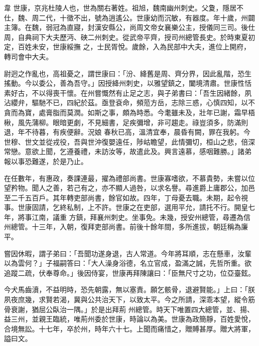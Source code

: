 
\begin{pinyinscope}

 韋
 世康，京兆杜陵人也，世為關右著姓。祖旭，魏南幽州刺史。父夐，隱居不仕，魏、周二代，十徵不出，號為逍遙公。世康幼而沉敏，有器度。年十歲，州闢主簿。在魏，弱冠為直寢，封漢安縣公，尚周文帝女襄樂公主，授儀同三司。後仕周，自典祠下大夫歷沔、硤二州刺史。從武帝平齊，授司州總管長史。於時東夏初定，百姓未安，世康綏撫
 之，士民胥悅。歲餘，入為民部中大夫，進位上開府，轉司會中大夫。



 尉迥之作亂也，高祖憂之，謂世康曰：「汾、絳舊是周、齊分界，因此亂階，恐生搖動。今以委公，善為吾守。」因授絳州刺史，以雅望鎮之，闔境清肅。世康性恬素好古，不以得喪干懷。在州嘗慨然有止足之志，與子弟書曰：「吾生因緒餘，夙沾纓弁，驅馳不已，四紀於茲。亟登袞命，頻蒞方岳，志除三惑，心慎四知，以不貪而為寶，處膏脂而莫潤。如斯之事，頗為時悉。今耄雖未及，壯年已謝，霜早梧楸，風先蒲柳。眼暗更劇，不見細書，足疾彌增，非可趨走。祿豈須多，防滿則退，年不待暮，有疾便辭。況娘
 春秋已高，溫清宜奉，晨昏有闕，罪在我躬。今世穆、世文並從戎役，吾與世沖復嬰遠任，陟岵瞻望，此情彌切，桓山之悲，倍深常戀。意欲上聞，乞遵養禮，未訪汝等，故遣此及。興言遠慕，感咽難勝。」諸弟報以事恐難遂，於是乃止。



 在任數年，有惠政，奏課連最，擢為禮部尚書。世康寡嗜欲，不慕貴勢，未嘗以位望矜物。聞人之善，若己有之，亦不顯人過咎，以求名譽。尋進爵上庸郡公，加邑至二千五百戶。其年轉吏部尚書，餘官如故。四年，丁母憂去職。未期，起令視事。世康固請，乞終私制，上不許。世康之在吏部，選用平允，請托不行。開皇七年，將事江南，議重
 方鎮，拜襄州刺史。坐事免。未幾，授安州總管，尋遷為信州總管。十三年，入朝，復拜吏部尚書。前後十餘年間，多所進拔，朝廷稱為廉平。



 嘗因休暇，謂子弟曰：「吾聞功遂身退，古人常道。今年將耳順，志在懸車，汝輩以為雲何？」子福嗣答曰：「大人澡身浴德，名立官成，盈滿之誠，先哲所重。欲追蹤二疏，伏奉尊命。」後因侍宴，世康再拜陳讓曰：「臣無尺寸之功，位亞臺鉉。



 今犬馬齒濆，不益明時，恐先朝露，無以塞責。願乞骸骨，退避賢能。」上曰：「朕夙夜庶幾，求賢若渴，冀與公共治天下，以致太平。今之所請，深乖本望，縱令筋骨衰謝，猶屈公臥治一隅。」於是出拜荊
 州總管。時天下唯置四大總管，並、揚、益三州，並親王臨統，唯荊州委於世康，時論以為美。世康為政簡靜，百姓愛悅，合境無訟。十七年，卒於州，時年六十七。上聞而痛惜之，贈賻甚厚。贈大將軍，謚曰文。




\end{pinyinscope}
